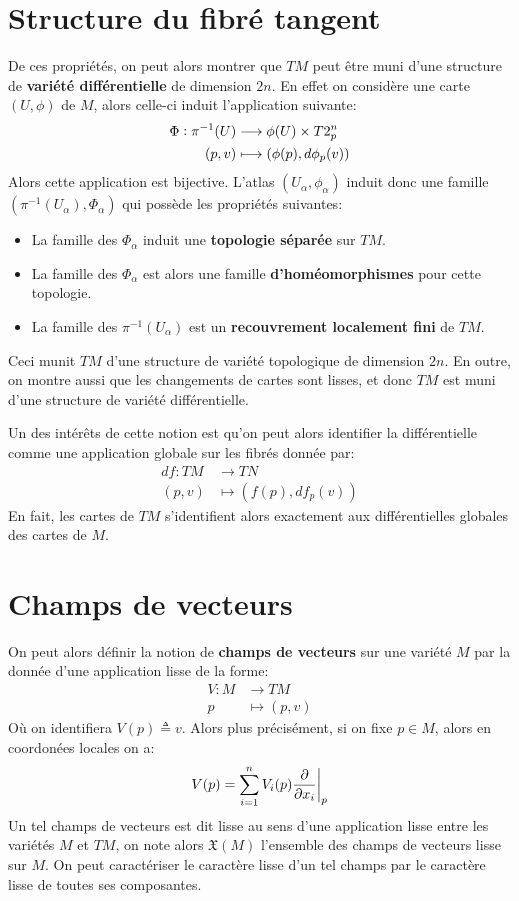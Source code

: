    \section{Structure du fibré tangent}
   De ces propriétés, on peut alors montrer que \( TM \) peut être muni d'une structure de \textbf{variété différentielle} de dimension \( 2n \). En effet on considère une carte \( (U, \phi) \) de \( M \), alors celle-ci induit l'application suivante:
   \begin{align*}
      \Phi : \pi^{-1}(U) &\longrightarrow \phi(U) \times T2^{n}_p\\
      (p, v) &\longmapsto (\phi(p), d\phi_p(v))
   \end{align*}
   Alors cette application est bijective. L'atlas \( (U_\alpha, \phi_\alpha) \) induit donc une famille \((\pi^{-1}(U_\alpha), \Phi_\alpha)\) qui possède les propriétés suivantes:
   \begin{itemize}
      \item La famille des \(\Phi_\alpha \) induit une \textbf{topologie séparée} sur \( TM \).
      \item La famille des \(\Phi_\alpha \) est alors une famille \textbf{d'homéomorphismes} pour cette topologie.
      \item La famille des \( \pi^{-1}(U_\alpha) \) est un \textbf{recouvrement localement fini} de \( TM \).
   \end{itemize}
   Ceci munit \( TM \) d'une structure de variété topologique de dimension \( 2n \). En outre, on montre aussi que les changements de cartes sont lisses, et donc \( TM \) est muni d'une structure de variété différentielle.\<

   Un des intérêts de cette notion est qu'on peut alors identifier la différentielle comme une application globale sur les fibrés donnée par:
   \[ 
      \begin{aligned}
         df : TM &\longrightarrow TN \\
         (p, v) &\longmapsto (f(p), df_p(v))
      \end{aligned} 
   \]
   En fait, les cartes de \( TM \) s'identifient alors exactement aux différentielles globales des cartes de \( M \).
   \section{Champs de vecteurs}
   On peut alors définir la notion de \textbf{champs de vecteurs} sur une variété \( M \) par la donnée d'une application lisse de la forme:
   \[ 
      \begin{aligned}
         V : M &\longrightarrow TM \\
         p &\longmapsto (p, v)
      \end{aligned} 
   \]
   Où on identifiera \( V(p) \triangleq v \). Alors plus précisément, si on fixe \( p \in M \), alors en coordonées locales on a:
   \[ 
      V(p) = \sum_{i = 1}^n V_i(p) \frac{\partial }{\partial x_i}\biggr|_p
   \]
   Un tel champs de vecteurs est dit lisse au sens d'une application lisse entre les variétés \( M \) et \( TM \), on note alors $\mathfrak{X}(M) $ l'ensemble des champs de vecteurs lisse sur \( M \). On peut caractériser le caractère lisse d'un tel champs par le caractère lisse de toutes ses composantes.
